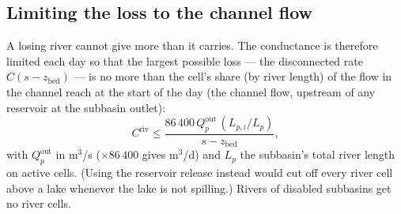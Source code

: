 \subsection{Limiting the loss to the channel flow}
A losing river cannot give more than it carries. The conductance is therefore limited each day so that the largest
possible loss --- the disconnected rate $C(s-z_{\mathrm{bed}})$ --- is no more than the cell's share (by river length) of
the flow in the channel reach at the start of the day (the channel flow, upstream of any reservoir at the subbasin outlet):
\begin{equation}
C^{\mathrm{riv}}\le\frac{86\,400\,Q^{\mathrm{out}}_p\,(L_{p,i}/L_p)}{s-z_{\mathrm{bed}}},
\end{equation}
with $Q^{\mathrm{out}}_p$ in m$^3$/s ($\times86\,400$ gives m$^3$/d) and $L_p$ the subbasin's total river length on active cells. (Using the reservoir
release instead would cut off every river cell above a lake whenever the lake is not spilling.) Rivers of disabled
subbasins get no river cells.

